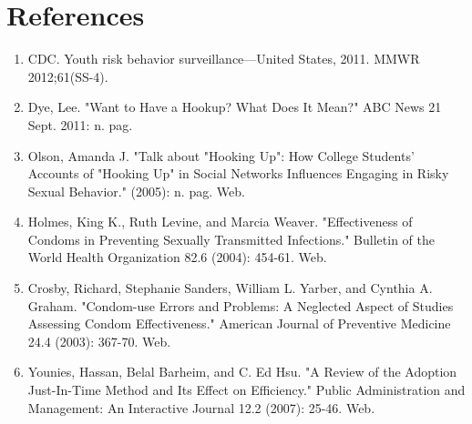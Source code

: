 \documentclass{acm_proc_article-sp}
\begin{document}
\section{References}
\smallskip
\begin{enumerate}[$^1$]
\item CDC. Youth risk behavior surveillance—United States, 2011. MMWR 2012;61(SS-4).
\item Dye, Lee. "Want to Have a Hookup? What Does It Mean?" ABC News 21 Sept. 2011: n. pag.
\item Olson, Amanda J. "Talk about "Hooking Up": How College Students' Accounts of "Hooking Up" in Social Networks Influences Engaging in Risky Sexual Behavior." (2005): n. pag. Web.
\item Holmes, King K., Ruth Levine, and Marcia Weaver. "Effectiveness of Condoms in Preventing Sexually Transmitted Infections." Bulletin of the World Health Organization 82.6 (2004): 454-61. Web.
\item Crosby, Richard, Stephanie Sanders, William L. Yarber, and Cynthia A. Graham. "Condom-use Errors and Problems: A Neglected Aspect of Studies Assessing Condom Effectiveness." American Journal of Preventive Medicine 24.4 (2003): 367-70. Web.
\item Younies, Hassan, Belal Barheim, and C. Ed Hsu. "A Review of the Adoption Just-In-Time Method and Its Effect on Efficiency." Public Administration and Management: An Interactive Journal 12.2 (2007): 25-46. Web.
\end{enumerate}
\end{document}

